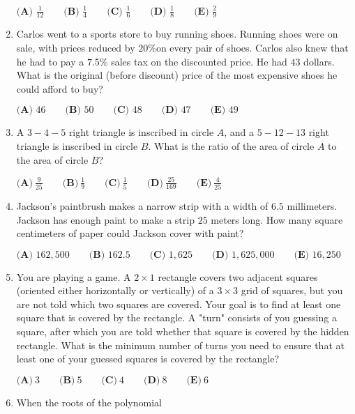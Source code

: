 \documentclass{article}
\begin{document}
\begin{enumerate}[label=\arabic*., itemsep=0.5em]
$\textbf{(A) }\frac{1}{12}\qquad\textbf{(B) }\frac{1}{4}\qquad\textbf{(C) }\frac{1}{6}\qquad\textbf{(D) }\frac{1}{8}\qquad\textbf{(E) }\frac{2}{9}$\par \vspace{0.5em}\item Carlos went to a sports store to buy running shoes. Running shoes were on sale, with prices reduced by $20\%$on every pair of shoes. Carlos also knew that he had to pay a $7.5\%$ sales tax on the discounted price. He had $43$ dollars. What is the original (before discount) price of the most expensive shoes he could afford to buy?

$\textbf{(A) }46\qquad\textbf{(B) }50\qquad\textbf{(C) }48\qquad\textbf{(D) }47\qquad\textbf{(E) }49$\par \vspace{0.5em}\item A $3-4-5$ right triangle is inscribed in circle $A$, and a $5-12-13$ right triangle is inscribed in circle $B$. What is the ratio of the area of circle $A$ to the area of circle $B$?

$\textbf{(A)}~\frac{9}{25}\qquad\textbf{(B)}~\frac{1}{9}\qquad\textbf{(C)}~\frac{1}{5}\qquad\textbf{(D)}~\frac{25}{169}\qquad\textbf{(E)}~\frac{4}{25}$\par \vspace{0.5em}\item Jackson's paintbrush makes a narrow strip with a width of $6.5$ millimeters. Jackson has enough paint to make a strip $25$ meters long. How many square centimeters of paper could Jackson cover with paint?

$\textbf{(A) }162,500\qquad\textbf{(B) }162.5\qquad\textbf{(C) }1,625\qquad\textbf{(D) }1,625,000\qquad\textbf{(E) }16,250$\par \vspace{0.5em}\item You are playing a game. A $2 \times 1$ rectangle covers two adjacent squares (oriented either horizontally or vertically) of a $3 \times 3$ grid of squares, but you are not told which two squares are covered. Your goal is to find at least one square that is covered by the rectangle. A "turn" consists of you guessing a square, after which you are told whether that square is covered by the hidden rectangle. What is the minimum number of turns you need to ensure that at least one of your guessed squares is covered by the rectangle?

$\textbf{(A)}~3\qquad\textbf{(B)}~5\qquad\textbf{(C)}~4\qquad\textbf{(D)}~8\qquad\textbf{(E)}~6$\par \vspace{0.5em}\item When the roots of the polynomial



\end{enumerate}
\end{document}
